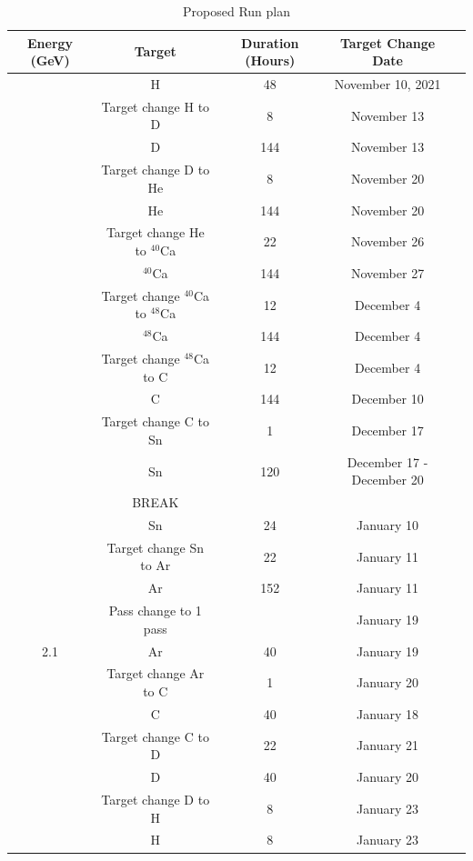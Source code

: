 \documentclass[12pt]{article}
\newcommand{\ra}[1]{\renewcommand{\arraystretch}{#1}}
\begin{document}
\begin{table}
\caption{Proposed Run plan}\label{tab:run_plan}
\centering\small
\begin{tabular}{@{}ccccc@{}}
\toprule
   Energy (GeV)  & Target  & Duration (Hours)  & Target Change Date\\
    \midrule
       \addlinespace[0.3cm]
 6.0 & H    & 48   & November 10, 2021 \\ 
 & Target change H to D & 8 & November 13\\
     & D     & 144   &  November 13    \\
  & Target change D to He & 8 & November 20\\
      & He   & 144  &  November 20\\
  & Target change He to  ${}^{40}$Ca& 22 & November 26\\     
     & ${}^{40}$Ca    & 144  &   November 27  \\
 & Target change  ${}^{40}$Ca to  ${}^{48}$Ca& 12 & December 4\\     
      & ${}^{48}$Ca   & 144  & December 4 \\
  & Target change  ${}^{48}$Ca to C& 12 & December 4\\     
     & C    &  144   &  December 10 \\     
  & Target change  C to Sn & 1 & December 17\\     
     & Sn  &  120  &  December 17 - December 20\\   
    & BREAK  &    &  \\   
    & Sn  & 24  &  January 10 \\   
  & Target change  Sn to Ar & 22 & January  11\\     
     & Ar    & 152    &  January 11\\     

    & Pass change to 1 pass  &    &January 19\\   
    2.1 & Ar     & 40  & January 19\\ 
      & Target change Ar to C & 1 & January 20\\  
      &  C    &  40   & January 18 \\
      & Target change C to D & 22 & January 21\\   
       &  D     &  40   & January 20 \\
      & Target change D to H & 8 & January 23\\   
      &  H    & 8   & January 23 \\


\end{tabular}
\end{table}
\end{document}
